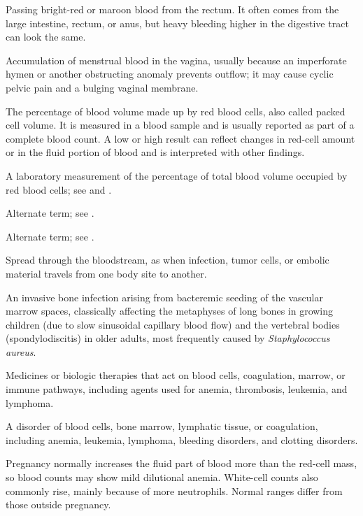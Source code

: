  Passing bright-red or maroon blood from the rectum. It often comes from the large intestine, rectum, or anus, but heavy bleeding higher in the digestive tract can look the same.

 Accumulation of menstrual blood in the vagina, usually because an imperforate hymen or another obstructing anomaly prevents outflow; it may cause cyclic pelvic pain and a bulging vaginal membrane.

 The percentage of blood volume made up by red blood cells, also called packed cell volume. It is measured in a blood sample and is usually reported as part of a complete blood count. A low or high result can reflect changes in red-cell amount or in the fluid portion of blood and is interpreted with other findings.

 A laboratory measurement of the percentage of total blood volume occupied by red blood cells; see  and .

 Alternate term; see .

 Alternate term; see .

 Spread through the bloodstream, as when infection, tumor cells, or embolic material travels from one body site to another.

 An invasive bone infection arising from bacteremic seeding of the vascular marrow spaces, classically affecting the metaphyses of long bones in growing children (due to slow sinusoidal capillary blood flow) and the vertebral bodies (spondylodiscitis) in older adults, most frequently caused by \textit{Staphylococcus aureus}.

 Medicines or biologic therapies that act on blood cells, coagulation, marrow, or immune pathways, including agents used for anemia, thrombosis, leukemia, and lymphoma.

 A disorder of blood cells, bone marrow, lymphatic tissue, or coagulation, including anemia, leukemia, lymphoma, bleeding disorders, and clotting disorders.

 Pregnancy normally increases the fluid part of blood more than the red-cell mass, so blood counts may show mild dilutional anemia. White-cell counts also commonly rise, mainly because of more neutrophils. Normal ranges differ from those outside pregnancy.


